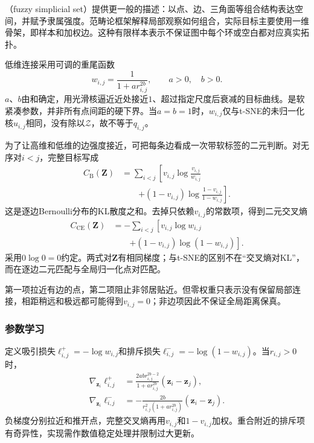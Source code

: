（fuzzy simplicial set）提供更一般的描述：以点、边、三角面等组合结构表达空间，并赋予隶属强度。范畴论框架解释局部观察如何组合，实际目标主要使用一维骨架，即样本和加权边。这种有限样本表示不保证图中每个环或空白都对应真实拓扑。

低维连接采用可调的重尾函数
\begin{equation}
  \label{eq:dim-umap-kernel}
  w_{i,j}=\frac{1}{1+a r_{i,j}^{2b}},\qquad a>0,\quad b>0.
\end{equation}
$a$、$b$由和确定，用光滑核逼近近处接近$1$、超过指定尺度后衰减的目标曲线。是软紧凑参数，并非所有点间距的硬下界。当$a=b=1$时，$w_{i,j}$仅与t-SNE的未归一化核$u_{i,j}$相同，没有除以$\mathcal{Z}$，故不等于$q_{i,j}$。

为了让高维和低维的边强度接近，可把每条边看成一次带软标签的二元判断。对无序对$i<j$，完整目标写成
\begin{equation}
  \label{eq:dim-umap-bernoulli}
  \begin{aligned}
    C_{\mathrm{B}}(\bm{Z})
      &=\sum_{i<j}\left[
        v_{i,j}\log\frac{v_{i,j}}{w_{i,j}}\right.\\
      &\qquad\left.+
        (1-v_{i,j})\log\frac{1-v_{i,j}}{1-w_{i,j}}
        \right].
  \end{aligned}
\end{equation}
这是逐边Bernoulli分布的KL散度之和。去掉只依赖$v_{i,j}$的常数项，得到二元交叉熵
\begin{equation}
  \label{eq:dim-umap-cross-entropy}
  \begin{aligned}
    C_{\mathrm{CE}}(\bm{Z})
      &=-\sum_{i<j}\left[
        v_{i,j}\log w_{i,j}\right.\\
      &\qquad\left.+
        (1-v_{i,j})\log(1-w_{i,j})\right].
  \end{aligned}
\end{equation}
采用$0\log0=0$约定。两式对$\bm{Z}$有相同梯度；与t-SNE的区别不在“交叉熵对KL”，而在逐边二元匹配与全局归一化点对匹配。

第一项拉近有边的点，第二项阻止非邻居贴近。但零权重只表示没有保留局部连接，相距稍远和极远都可能得到$v_{i,j}=0$；非边项因此不保证全局距离保真。

\subsubsection{参数学习}

定义吸引损失$\ell^+_{i,j}=-\log w_{i,j}$和排斥损失$\ell^-_{i,j}=-\log(1-w_{i,j})$。当$r_{i,j}>0$时，
\begin{equation}
  \label{eq:dim-umap-pair-gradient}
  \begin{aligned}
    \nabla_{\bm{z}_i}\ell^+_{i,j}
      &=\frac{2ab r_{i,j}^{2b-2}}
        {1+a r_{i,j}^{2b}}(\bm{z}_i-\bm{z}_j),\\
    \nabla_{\bm{z}_i}\ell^-_{i,j}
      &=-\frac{2b}
        {r_{i,j}^2(1+a r_{i,j}^{2b})}
        (\bm{z}_i-\bm{z}_j).
  \end{aligned}
\end{equation}
负梯度分别拉近和推开点，完整交叉熵再用$v_{i,j}$和$1-v_{i,j}$加权。重合附近的排斥项有奇异性，实现需作数值稳定处理并限制过大更新。

